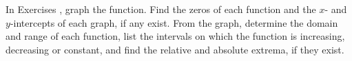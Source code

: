 {\noindent In Exercises}
{, graph the function. Find the zeros of each function and the $x$- and $y$-intercepts of each graph, if any exist.  From the graph, determine the domain and range of each function, list the intervals on which the function is increasing, decreasing or constant, and find the relative and absolute extrema, if they exist.}

